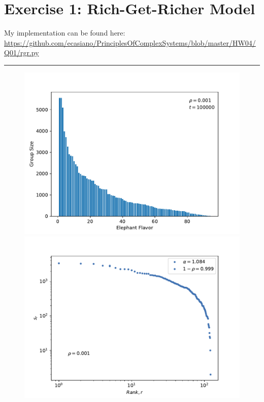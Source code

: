 \documentclass{article}
\begin{document}
\section{Exercise 1: Rich-Get-Richer Model}

My implementation can be found here: \url{https://github.com/ecasiano/PrinciplesOfComplexSystems/blob/master/HW04/Q01/rgr.py} \\

\hrule %

\begin{figure}[H]

\begin{minipage}{0.47\textwidth}
    \includegraphics[width=\linewidth]{Q01/richGetRicherBarChart_rho0d001}
    \end{minipage}
    \hspace{\fill} %
    \begin{minipage}{0.47\textwidth}
    \includegraphics[width=\linewidth]{Q01/rgr_zipf_rho0d001.pdf}
    \end{minipage}


\end{figure}
\end{document}
